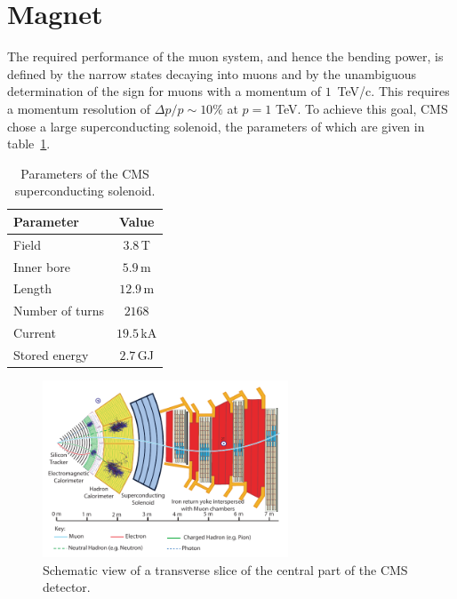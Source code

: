 \section{Magnet}
The required performance of the muon system, and hence the bending power, is defined by the narrow states decaying into muons and by the unambiguous determination of the sign for muons with a momentum of $ 1\,$ TeV/c. This requires a momentum resolution of $\Delta p / p \sim 10 \%$ at $p = 1$ TeV.  To achieve this goal, CMS chose a large superconducting solenoid, the parameters of which are given in table~\ref{tab:magnetParameters}. 
\begin{table}[h!]
\centering

 \begin{tabular}{ l  c }
\toprule
Parameter & Value \\
  \midrule
  Field & $3.8\,$T \\
  Inner bore & $5.9 \,$m \\
  Length & $12.9 \,$m \\
  Number of turns & $2168$ \\
  Current & $19.5 \,$kA \\
  Stored energy & $2.7 \,$GJ\\
  \bottomrule
 \end{tabular}
 \caption{Parameters of the CMS superconducting solenoid.}
\label{tab:magnetParameters}
\end{table}
\begin{figure}[h!]
 \centering
 \includegraphics[width=0.65\textwidth]{Images/cms_slice.pdf}
 \caption{Schematic view of a transverse slice of the central part of the CMS detector.}
\label{fig:cmsSection}
\end{figure}
 
